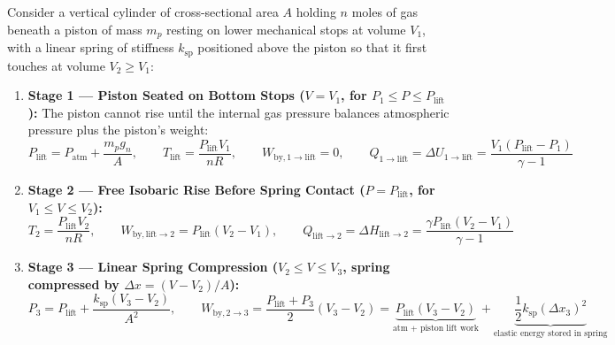 \begin{formulacard}
Consider a vertical cylinder of cross-sectional area $A$ holding $n$ moles of gas beneath a piston of mass $m_p$ resting on lower mechanical stops at volume $V_1$, with a linear spring of stiffness $k_{\mathrm{sp}}$ positioned above the piston so that it first touches at volume $V_2 \ge V_1$:
\begin{enumerate}
  \item \textbf{Stage 1 — Piston Seated on Bottom Stops ($V = V_1$, for $P_1 \le P \le P_{\mathrm{lift}}$):}
  The piston cannot rise until the internal gas pressure balances atmospheric pressure plus the piston's weight:
  \begin{equation}\label{eq:07:piston-lift}
    \boxed{P_{\mathrm{lift}} = P_{\mathrm{atm}} + \frac{m_p g_n}{A}}, \qquad T_{\mathrm{lift}} = \frac{P_{\mathrm{lift}}V_1}{nR}, \qquad W_{\mathrm{by},1\to\mathrm{lift}} = 0, \qquad Q_{1\to\mathrm{lift}} = \Delta U_{1\to\mathrm{lift}} = \frac{V_1(P_{\mathrm{lift}} - P_1)}{\gamma - 1}
  \end{equation}
  \item \textbf{Stage 2 — Free Isobaric Rise Before Spring Contact ($P = P_{\mathrm{lift}}$, for $V_1 \le V \le V_2$):}
  \begin{equation}\label{eq:07:piston-free}
    T_2 = \frac{P_{\mathrm{lift}}V_2}{nR}, \qquad W_{\mathrm{by},\mathrm{lift}\to 2} = P_{\mathrm{lift}}(V_2 - V_1), \qquad Q_{\mathrm{lift}\to 2} = \Delta H_{\mathrm{lift}\to 2} = \frac{\gamma P_{\mathrm{lift}}(V_2 - V_1)}{\gamma - 1}
  \end{equation}
  \item \textbf{Stage 3 — Linear Spring Compression ($V_2 \le V \le V_3$, spring compressed by $\Delta x = (V - V_2)/A$):}
  \begin{equation}\label{eq:07:piston-spring-stage}
    P_3 = P_{\mathrm{lift}} + \frac{k_{\mathrm{sp}}(V_3 - V_2)}{A^2}, \qquad W_{\mathrm{by},2\to 3} = \frac{P_{\mathrm{lift}} + P_3}{2}(V_3 - V_2) = \underbrace{P_{\mathrm{lift}}(V_3 - V_2)}_{\text{atm + piston lift work}} + \underbrace{\frac{1}{2}k_{\mathrm{sp}}(\Delta x_3)^2}_{\text{elastic energy stored in spring}}
  \end{equation}
\end{enumerate}
\end{formulacard}

